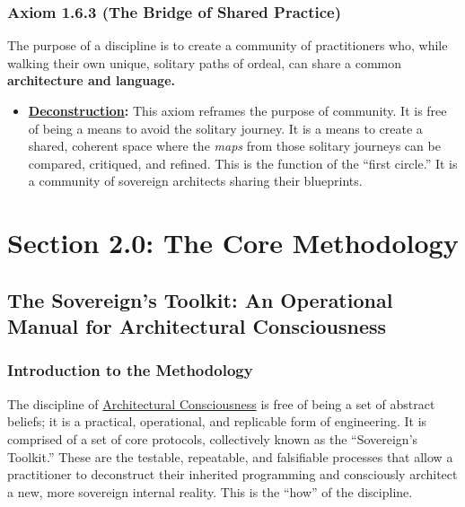 \documentclass{article}
\begin{document}
\subsubsection*{Axiom 1.6.3 (The Bridge of Shared Practice)}
The purpose of a discipline is to create a community of practitioners who, while walking their own unique, solitary paths of ordeal, can share a common \textbf{architecture and language.}
\begin{itemize}
    \item \textbf{\hyperlink{gloss:deconstruction}{Deconstruction}:} This axiom reframes the purpose of community. It is free of being a means to avoid the solitary journey. It is a means to create a shared, coherent space where the \textit{maps} from those solitary journeys can be compared, critiqued, and refined. This is the function of the ``first circle.'' It is a community of sovereign architects sharing their blueprints.
\end{itemize}


\section*{Section 2.0: The Core Methodology}
\subsection*{The Sovereign's Toolkit: An Operational Manual for Architectural Consciousness}
\subsubsection*{Introduction to the Methodology}

The discipline of \hyperlink{gloss:architectural_consciousness}{Architectural Consciousness} is free of being a set of abstract beliefs; it is a practical, operational, and replicable form of engineering. It is comprised of a set of core protocols, collectively known as the ``Sovereign's Toolkit.'' These are the testable, repeatable, and falsifiable processes that allow a practitioner to deconstruct their inherited programming and consciously architect a new, more sovereign internal reality. This is the ``how'' of the discipline.
\end{document}
